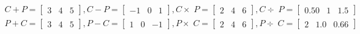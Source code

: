 \documentclass[UTF8,a4paper,notitlepage,openany,plain,final]{ctexbook}
\begin{document}
    \[ \begin{split}
        C + P =
        \begin{bmatrix}
            3 & 4 & 5
        \end{bmatrix}
        , C - P =
        \begin{bmatrix}
            -1 & 0 & 1
        \end{bmatrix}
        , C \times\; P =
        \begin{bmatrix}
            2 & 4 & 6
        \end{bmatrix}
        , C \div\; P =
        \begin{bmatrix}
            0.50 & 1 & 1.5
        \end{bmatrix}
        \\
        P + C =
        \begin{bmatrix}
            3 & 4 & 5
        \end{bmatrix}
        , P - C =
        \begin{bmatrix}
            1 & 0 & -1
        \end{bmatrix}
        , P \times\; C =
        \begin{bmatrix}
            2 & 4 & 6
        \end{bmatrix}
        , P \div\; C =
        \begin{bmatrix}
            2 & 1.0 & 0.66
        \end{bmatrix}
    \end{split} \]
\end{document}
